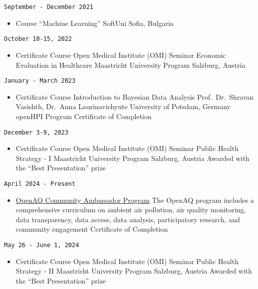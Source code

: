\documentclass[
  12pt,
  letterpaper,
  DIV=11,
  numbers=noendperiod]{scrartcl}
\providecommand{\tightlist}{%
  \setlength{\itemsep}{0pt}\setlength{\parskip}{0pt}}\usepackage{longtable,booktabs,array}
\begin{document}
\texttt{September\ -\ December\ 2021}

\begin{itemize}
\tightlist
\item
  Course ``Machine Learning'' \textbar{} SoftUni \textbar{} Sofia,
  Bulgaria
\end{itemize}

\texttt{October\ 10-15,\ 2022}

\begin{itemize}
\tightlist
\item
  Certificate Course \textbar{} Open Medical Institute (OMI) Seminar
  \textbar{} Economic Evaluation in Healthcare \textbar{} Maastricht
  University Program \textbar{} Salzburg, Austria
\end{itemize}

\texttt{January\ -\ March\ 2023}

\begin{itemize}
\tightlist
\item
  Certificate Course \textbar{} Introduction to Bayesian Data Analysis
  \textbar{} Prof.~Dr.~Shravan Vasishth, Dr.~Anna Laurinavichyute
  \textbar{} University of Potsdam, Germany \textbar{} openHPI Program
  \textbar{} Certificate of Completion
\end{itemize}

\texttt{December\ 3-9,\ 2023}

\begin{itemize}
\tightlist
\item
  Certificate Course \textbar{} Open Medical Institute (OMI) Seminar
  \textbar{} Public Health Strategy - I \textbar{} Maastricht University
  Program \textbar{} Salzburg, Austria \textbar{} Awarded with the
  ``Best Presentation'' prize
\end{itemize}

\texttt{April\ 2024\ -\ Present}

\begin{itemize}
\tightlist
\item
  \href{https://openaq.org/about/people/kostadin-kostadinov/}{OpenAQ
  Community Ambassador Program} \textbar{} The OpenAQ program includes a
  comprehensive curriculum on ambient air pollution, air quality
  monitoring, data transparency, data access, data analysis,
  participatory research, and community engagement \textbar{}
  Certificate of Completion
\end{itemize}

\texttt{May\ 26\ -\ June\ 1,\ 2024}

\begin{itemize}
\tightlist
\item
  Certificate Course \textbar{} Open Medical Institute (OMI) Seminar
  \textbar{} Public Health Strategy - II \textbar{} Maastricht
  University Program \textbar{} Salzburg, Austria \textbar{} Awarded
  with the ``Best Presentation'' prize
\end{itemize}
\end{document}
